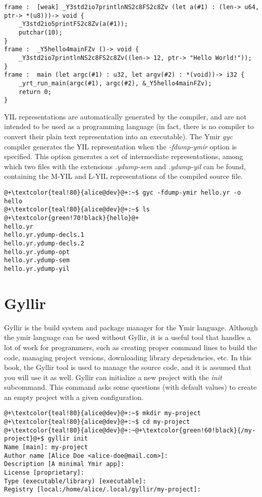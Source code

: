 \begin{lstlisting}[style=lyilVerb, caption=L-YIL reprensentation of \textit{hello.yr}]
frame :  [weak] _Y3std2io7printlnNS2c8FS2c8Zv (let a(#1) : (len-> u64, ptr-> *(u8)))-> void {
    _Y3std2io5printFS2c8Zv(a(#1));
    putchar(10);
}
frame :  _Y5hello4mainFZv ()-> void {
    _Y3std2io7printlnNS2c8FS2c8Zv((len-> 12, ptr-> "Hello World!"));
}
frame :  main (let argc(#1) : u32, let argv(#2) : *(void))-> i32 {
    _yrt_run_main(argc(#1), argc(#2), &_Y5hello4mainFZv);
    return 0;
}
\end{lstlisting}

YIL representations are automatically generated by the compiler, and are not
intended to be used as a programming language (in fact, there is no compiler to
convert their plain text representation into an executable). The
Ymir \textit{gyc} compiler generates the YIL representation when
the \textit{-fdump-ymir} option is specified. This option generates a set of
intermediate representations, among which two files with the
extensions \textit{.ydump-sem} and \textit{.ydump-yil} can be found, containing
the M-YIL and L-YIL representations of the compiled source file.

\begin{lstlisting}[style=bashVerb, escapechar=@+]
@+\textcolor{teal!80}{alice@dev}@+:~$ gyc -fdump-ymir hello.yr -o hello
@+\textcolor{teal!80}{alice@dev}@+:~$ ls
@+\textcolor{green!70!black}{hello}@+
hello.yr
hello.yr.ydump-decls.1
hello.yr.ydump-decls.2
hello.yr.ydump-opt
hello.yr.ydump-sem
hello.yr.ydump-yil
\end{lstlisting}


\section{Gyllir}

Gyllir is the build system and package manager for the Ymir language. Although
the ymir language can be used without Gyllir, it is a useful tool that handles a
lot of work for programmers, such as creating proper command lines to build the
code, managing project versions, downloading library dependencies, etc. In this
book, the Gyllir tool is used to manage the source code, and it is assumed that
you will use it as well. Gyllir can initialize a new project with
the \textit{init} subcommand. This command asks some questions (with default
values) to create an empty project with a given configuration.

\begin{lstlisting}[style=bashVerb, escapechar=@+]
@+\textcolor{teal!80}{alice@dev}@+:~$ mkdir my-project
@+\textcolor{teal!80}{alice@dev}@+:~$ cd my-project
@+\textcolor{teal!80}{alice@dev}@+:~@+\textcolor{green!60!black}{/my-project}@+$ gyllir init
Name [main]: my-project
Author name [Alice Doe <alice-doe@mail.com>]:
Description [A minimal Ymir app]:
License [proprietary]:
Type (executable/library) [executable]:
Registry [local:/home/alice/.local/gyllir/my-project]:
\end{lstlisting}

